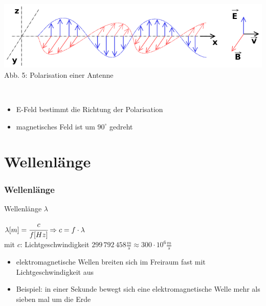 \begin{frame}
\begin{center}
        \begin{minipage}{0.45\textwidth}
            \includegraphics[width=\textwidth,height=.8\textheight,keepaspectratio]{e08/Onde_electromagnetique.png}\\
                {\scriptsize Abb. 5: Polarisation einer Antenne}
        \end{minipage}\\[1.5em]

	    \begin{itemize}
	    	\item E-Feld bestimmt die Richtung der Polarisation 
	    	\item magnetisches Feld ist um $90^\circ$ gedreht
	    \end{itemize}
    
    \end{center}

\end{frame}

\section*{Wellenlänge}

\begin{frame}
    \frametitle{Wellenlänge}

    \begin{center}
        \begin{block}{Wellenlänge $\lambda$}
            \begin{center}
                {\Huge$ \lambda [m] = \cfrac{c}{f [Hz]} \Rightarrow
                c = f \cdot \lambda $} \\[1em]
                mit $c$: Lichtgeschwindigkeit $299\,792\,458 \frac{m}{s} \approx
                300\cdot10^6\frac{m}{s}$
            \end{center}
        \end{block}

	    \begin{normalsize}		
	        \begin{itemize}
		        \item elektromagnetische Wellen breiten sich im Freiraum fast mit Lichtgeschwindigkeit aus
		        \item Beispiel: in einer Sekunde bewegt sich eine elektromagnetische Welle mehr als sieben mal um die Erde
	        \end{itemize}
	    \end{normalsize}
    \end{center}
\end{frame}

